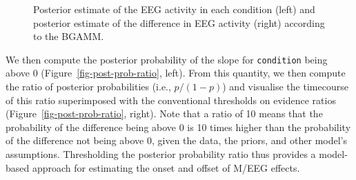 \documentclass[
  man,
  floatsintext,
  longtable,
  a4paper,
  nolmodern,
  notxfonts,
  notimes,
  colorlinks=true,linkcolor=blue,citecolor=blue,urlcolor=blue]{apa7}
\begin{document}
\begin{figure}[!htb]

\caption{\label{fig-plot-post-slope}Posterior estimate of the EEG
activity in each condition (left) and posterior estimate of the
difference in EEG activity (right) according to the BGAMM.}


\end{figure}%

We then compute the posterior probability of the slope for
\texttt{condition} being above \(0\) (Figure~\ref{fig-post-prob-ratio},
left). From this quantity, we then compute the ratio of posterior
probabilities (i.e., \(p/(1-p)\)) and visualise the timecourse of this
ratio superimposed with the conventional thresholds on evidence ratios
(Figure~\ref{fig-post-prob-ratio}, right). Note that a ratio of 10 means
that the probability of the difference being above 0 is 10 times higher
than the probability of the difference not being above 0, given the
data, the priors, and other model's assumptions. Thresholding the
posterior probability ratio thus provides a model-based approach for
estimating the onset and offset of M/EEG effects.
\end{document}
